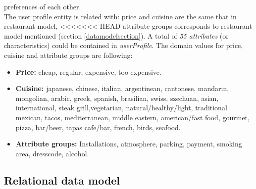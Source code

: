 preferences of each other. \\The user profile entity is related with: 
price and cuisine are the same that in restaurant model,
<<<<<<< HEAD
attribute groups corresponds to restaurant model mentioned 
(section  \ref{datamodelsection}). A total of \textit{55 attributes}
(or characteristics)  could be contained in \textit{userProfile}. 
The domain values for price,  cuisine and attribute groups are following:
\begin{itemize}
\item \textbf{Price:} cheap, regular, expensive, too expensive.
\item \textbf{Cuisine:} japanese, chinese, italian, argentinean,
cantonese, mandarin, mongolian, arabic, greek, spanish, brasilian,
swiss, szechuan, asian, international, steak grill,vegetarian,
natural/healthy/light, traditional mexican, tacos, mediterranean,
middle eastern, american/fast food, gourmet, pizza, bar/beer, tapas
cafe/bar, french, birds, seafood.
\item  \textbf{Attribute groups:} Installations, atmosphere, 
parking, payment, smoking area, dresscode, alcohol.
\end{itemize}

\subsection{Relational data model} 

